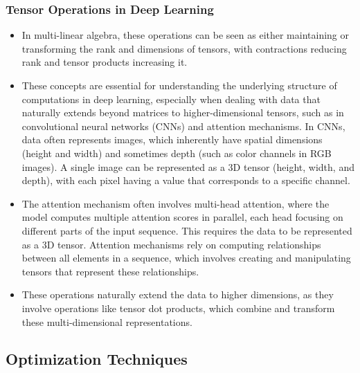 \documentclass{article}
\begin{document}
\subsubsection{Tensor Operations in Deep Learning}
\begin{itemize}
    \item In multi-linear algebra, these operations can be seen as either maintaining or transforming the rank and dimensions of tensors, with contractions reducing rank and tensor products increasing it. 
    \item These concepts are essential for understanding the underlying structure of computations in deep learning, especially when dealing with data that naturally extends beyond matrices to higher-dimensional tensors, such as in convolutional neural networks (CNNs) and attention mechanisms. In CNNs, data often represents images, which inherently have spatial dimensions (height and width) and sometimes depth (such as color channels in RGB images). A single image can be represented as a 3D tensor (height, width, and depth), with each pixel having a value that corresponds to a specific channel. 
    \item The attention mechanism often involves multi-head attention, where the model computes multiple attention scores in parallel, each head focusing on different parts of the input sequence. This requires the data to be represented as a 3D tensor. Attention mechanisms rely on computing relationships between all elements in a sequence, which involves creating and manipulating tensors that represent these relationships. 
    \item These operations naturally extend the data to higher dimensions, as they involve operations like tensor dot products, which combine and transform these multi-dimensional representations.
\end{itemize}


\subsection{Optimization Techniques}
\end{document}

